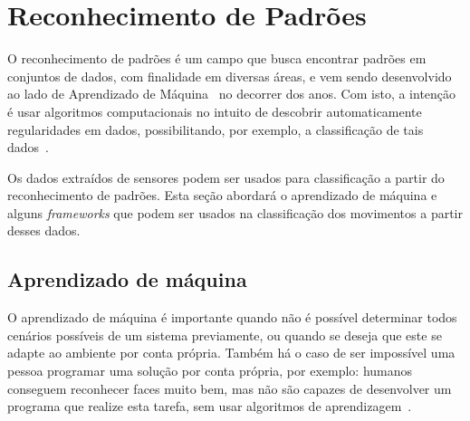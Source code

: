 

\section{Reconhecimento de Padrões}\label{sec:patternrec}

O reconhecimento de padrões é um campo que busca encontrar padrões em conjuntos de dados, com finalidade em diversas áreas, e vem sendo desenvolvido ao lado de Aprendizado de Máquina~\cite{samuel:1959machine_learning} no decorrer dos anos. Com isto, a intenção é usar algoritmos computacionais no intuito de descobrir automaticamente regularidades em dados, possibilitando, por exemplo, a classificação de tais dados~\cite{bishop:2006}.

Os dados extraídos de sensores podem ser usados para classificação a partir do reconhecimento de padrões. Esta seção abordará o aprendizado de máquina e alguns \textit{frameworks} que podem ser usados na classificação dos movimentos a partir desses dados.

\subsection{Aprendizado de máquina}\label{sec:ml}

O aprendizado de máquina é importante quando não é possível determinar todos cenários possíveis de um sistema previamente, ou quando se deseja que este se adapte ao ambiente por conta própria. Também há o caso de ser impossível uma pessoa programar uma solução por conta própria, por exemplo: humanos conseguem reconhecer faces muito bem, mas não são capazes de desenvolver um programa que realize esta tarefa, sem usar algoritmos de aprendizagem~\cite{russell:2010}.

